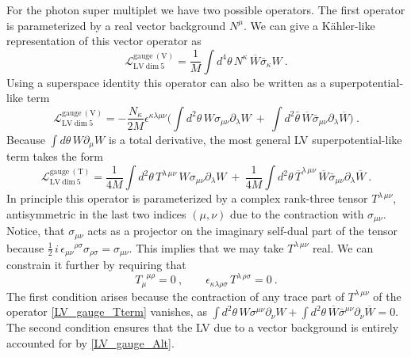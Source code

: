 \documentclass[12pt]{revtex4}
\begin{document}
For the photon super multiplet we have two possible operators. The
first operator is parameterized by a real vector background $N^\mu$.
We can give a K\"ahler-like representation of this vector operator as 
\begin{equation}
\label{LV_gauge}
\mathcal{L}_{\mathrm{LV\ dim\ 5}}^{\mathrm{gauge\ (V)}} = 
\frac 1M \int d^4\theta \, 
N^\kappa\, \overline{W} \bar{\sigma}_\kappa W~.   
\end{equation}
Using a superspace identity this operator can also be written as a
superpotential-like term  
\begin{equation}
\label{LV_gauge_Alt}
\mathcal{L}_{\mathrm{LV\ dim\ 5}}^{\mathrm{gauge\ (V)}} = 
- \frac {N_\kappa}{2 M} \epsilon^{\kappa\lambda\mu\nu} 
\Big( 
\int d^2\theta\, W \sigma_{\mu\nu} \partial_\lambda W ~+~
\int d^2\bar{\theta}\, \overline{W} \bar{\sigma}_{\mu\nu}
\partial_\lambda \overline{W} 
\Big)~.
\end{equation} 
Because $\int d\theta\, W\partial_\mu W$ is a total derivative, 
the most general LV superpotential-like term takes the form 
\begin{equation}
\label{LV_gauge_Tterm}
\mathcal{L}_{\mathrm{LV\ dim\ 5}}^{\mathrm{gauge\ (T)}} =
\frac 1{4M} 
\int d^2\theta \, T^{\lambda\, \mu\nu} \,
        W \sigma_{\mu\nu} \partial_\lambda W  
~+~ \frac 1{4M} 
\int d^2\theta \, \overline{T}^{\lambda\, \mu\nu} \,
        \overline{W} \bar{\sigma}_{\mu\nu} \partial_\lambda\overline{W}  
~.
\end{equation}
In principle this operator is parameterized by a complex rank-three
tensor $T^{\lambda\,\mu\nu}$, antisymmetric in the last two indices
$(\mu,\nu)$ due to the contraction with $\sigma_{\mu\nu}$. Notice, that
$\sigma_{\mu\nu}$ acts as a projector on the imaginary self-dual part
of the tensor because 
\(
\frac{1}{2}\,i\,\epsilon_{\mu\nu}{}^{\rho\sigma}
\sigma_{\rho\sigma} = \sigma_{\mu\nu}. 
\)
This implies that we may take $T^{\lambda\,\mu\nu}$ real. We can
constrain it further by requiring that 
\begin{equation}
T_\mu^{\phantom{\mu}\mu\rho} = 0~,
 \qquad 
\epsilon_{\kappa\lambda\rho\sigma}\, T^{\lambda\,\rho\sigma}  =  0~.
\end{equation} 
The first condition arises because the contraction of any trace part of
$T^{\lambda\,\mu\nu}$ of the operator \eqref{LV_gauge_Tterm} vanishes, as
\(
\int d^2\theta \, W\sigma^{\mu\nu} \partial_\nu W + 
\int d^2\theta \, \overline{W} \bar\sigma^{\mu\nu} \partial_\nu
\overline{W} = 0. 
\)
The second condition ensures that the LV due to a vector 
background is entirely accounted for by \eqref{LV_gauge_Alt}.
\end{document}

